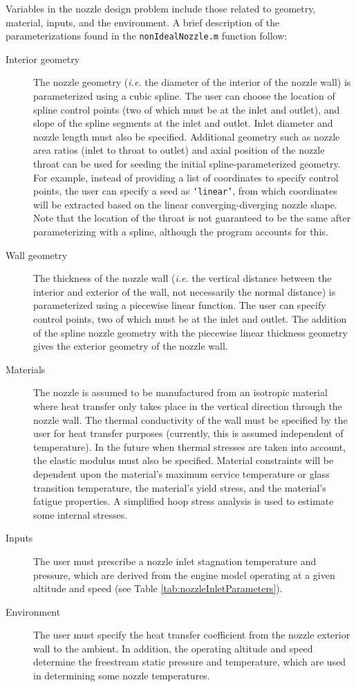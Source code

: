 \documentclass{article}
\begin{document}
Variables in the nozzle design problem include those related to geometry, material, inputs, and the environment. A brief description of the parameterizations found in the \texttt{nonIdealNozzle.m} function follow:

\begin{description}
\item[Interior geometry] The nozzle geometry (\textit{i.e.} the diameter of the interior of the nozzle wall) is parameterized using a cubic spline. The user can choose the location of spline control points (two of which must be at the inlet and outlet), and slope of the spline segments at the inlet and outlet. Inlet diameter and nozzle length must also be specified. Additional geometry such as nozzle area ratios (inlet to throat to outlet) and axial position of the nozzle throat can be used for seeding the initial spline-parameterized geometry. For example, instead of providing a list of coordinates to specify control points, the user can specify a seed as \texttt{`linear'}, from which coordinates will be extracted based on the linear converging-diverging nozzle shape. Note that the location of the throat is not guaranteed to be the same after parameterizing with a spline, although the program accounts for this.
\item[Wall geometry] The thickness of the nozzle wall (\textit{i.e.} the vertical distance between the interior and exterior of the wall, not necessarily the normal distance) is parameterized using a piecewise linear function. The user can specify control points, two of which must be at the inlet and outlet. The addition of the spline nozzle geometry with the piecewise linear thickness geometry gives the exterior geometry of the nozzle wall.
\item[Materials] The nozzle is assumed to be manufactured from an isotropic material where heat transfer only takes place in the vertical direction through the nozzle wall. The thermal conductivity of the wall must be specified by the user for heat transfer purposes (currently, this is assumed independent of temperature). In the future when thermal stresses are taken into account, the elastic modulus must also be specified. Material constraints will be dependent upon the material's maximum service temperature or glass transition temperature, the material's yield stress, and the material's fatigue properties. A simplified hoop stress analysis is used to estimate some internal stresses.
\item[Inputs] The user must prescribe a nozzle inlet stagnation temperature and pressure, which are derived from the engine model operating at a given altitude and speed (see Table \ref{tab:nozzleInletParameters}).
\item[Environment] The user must specify the heat transfer coefficient from the nozzle exterior wall to the ambient. In addition, the operating altitude and speed determine the freestream static pressure and temperature, which are used in determining some nozzle temperatures.
\end{description}
\end{document}
